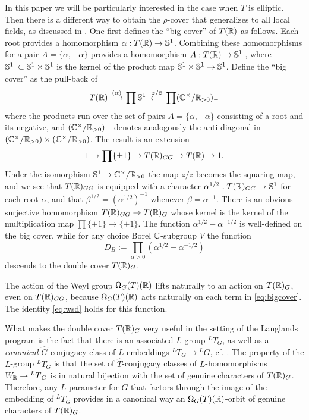 \documentclass{article}
\theoremstyle{definition}
\numberwithin{equation}{section}
\renewcommand{\-}{\hyp{}}
\begin{document}
In this paper we will be particularly interested in the case when $T$ is elliptic. Then there is a different way to obtain the $\rho$-cover that generalizes to all local fields, as discussed in \cite{KalDC}. One first defines the ``big cover'' of $T(\mathbb{R})$ as follows. Each root provides a homomorphism $\alpha : T(\mathbb{R}) \to \mathbb{S}^1$. Combining these homomorphisms for a pair $A=\{\alpha,-\alpha\}$ provides a homomorphism $A : T(\mathbb{R}) \to \mathbb{S}^1_-$, where $\mathbb{S}^1_- \subset \mathbb{S}^1 \times \mathbb{S}^1$ is the kernel of the product map $\mathbb{S}^1 \times \mathbb{S}^1 \to \mathbb{S}^1$. Define the ``big cover'' as the pull-back of
\begin{equation} \label{eq:bigcover}
T(\mathbb{R}) \stackrel{(\alpha)}{\longrightarrow} \prod \mathbb{S}^1_- \stackrel{z/\bar z}{\longleftarrow} \prod(\mathbb{C}^\times/\mathbb{R}_{>0})_-
\end{equation}
where the products run over the set of pairs $A=\{\alpha,-\alpha\}$ consisting of a root and its negative, and $(\mathbb{C}^\times/\mathbb{R}_{>0})_-$ denotes analogously the anti-diagonal in $(\mathbb{C}^\times/\mathbb{R}_{>0}) \times (\mathbb{C}^\times/\mathbb{R}_{>0})$. The result is an extension
\[ 1 \to \prod\{\pm1\} \to T(\mathbb{R})_{GG} \to T(\mathbb{R}) \to 1. \]
Under the isomorphism $\mathbb{S}^1 \to \mathbb{C}^\times/\mathbb{R}_{>0}$ the map $z/\bar z$ becomes the squaring map, and we see that $T(\mathbb{R})_{GG}$ is equipped with a character $\alpha^{1/2} : T(\mathbb{R})_{GG} \to \mathbb{S}^1$ for each root $\alpha$, and that $\beta^{1/2}=(\alpha^{1/2})^{-1}$ whenever $\beta=\alpha^{-1}$. There is an obvious surjective homomorphism $T(\mathbb{R})_{GG} \to T(\mathbb{R})_G$ whose kernel is the kernel of the multiplication map $\prod\{\pm1\} \to \{\pm1\}$. The function $\alpha^{1/2}-\alpha^{-1/2}$ is well-defined on the big cover, while for any choice Borel $\mathbb{C}$-subgroup $V$ the function
\[ D_B := \prod_{\alpha>0}(\alpha^{1/2}-\alpha^{-1/2}) \]
descends to the double cover $T(\mathbb{R})_G$.

The action of the Weyl group $\Omega_G(T)(\mathbb{R})$ lifts naturally to an action on $T(\mathbb{R})_G$, even on $T(\mathbb{R})_{GG}$, because $\Omega_G(T)(\mathbb{R})$ acts naturally on each term in \eqref{eq:bigcover}. The identity \eqref{eq:wsd} holds for this function.

What makes the double cover $T(\mathbb{R})_G$ very useful in the setting of the Langlands program is the fact that there is an associated $L$-group $^LT_G$, as well as a \emph{canonical} $\hat G$-conjugacy class of $L$-embeddings $^LT_G \to {^LG}$, cf. \cite[\S4.1]{KalDC}. The property of the $L$-group $^LT_G$ is that the set of $\hat T$-conjugacy classes of $L$-homomorphisms $W_{\mathbb{R}} \to {^LT}_G$ is in natural bijection with the set of genuine characters of $T(\mathbb{R})_G$. Therefore, any $L$-parameter for $G$ that factors through the image of the embedding of $^LT_G$ provides in a canonical way an $\Omega_G(T)(\mathbb{R})$-orbit of genuine characters of $T(\mathbb{R})_G$.
\end{document}
